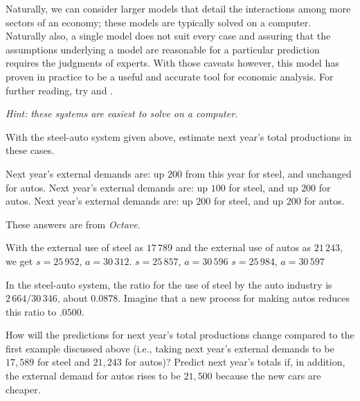 Naturally, we can consider larger models that detail the interactions 
among more sectors of an economy;
these models are typically solved on a computer.
Naturally also, a single model does not suit every case and 
assuring that the assumptions underlying a model
are reasonable for a particular prediction requires the judgments of experts.
With those caveats
however, this model has proven in practice to be a useful and accurate tool for
economic analysis.
For further reading, try \cite{Leontief1951} and \cite{Leontief1965}. 


\begin{exercises}
  \item[\textit{Hint:}]  
    \textit{these systems are easiest to solve on a computer.}
  \item 
    With the steel-auto system given above, estimate next year's
    total productions in these cases.
    \begin{exparts}
      \partsitem Next year's external demands are: up $200$ from this
         year for steel, and unchanged for autos.
      \partsitem Next year's external demands are: up $100$ for steel, and
         up $200$ for autos.
      \partsitem Next year's external demands are: up $200$ for steel, and
         up $200$ for autos.
    \end{exparts} 
    \begin{answer}
      These answers are from \textit{Octave}.
      \begin{exparts}
        \partsitem With the external use of steel as $17\,789$ and the 
          external use of autos as $21\,243$, we get $s=25\,952$, $a=30\,312$.
        \partsitem $s=25\,857$, $a=30\,596$
        \partsitem $s=25\,984$, $a=30\,597$
      \end{exparts}
    \end{answer}
  \item 
    In the steel-auto system, the ratio for the use of steel by the auto
    industry is $2\,664/30\,346$, about $0.0878$.
    Imagine that a new process for making autos reduces this 
    ratio to $.0500$.
    \begin{exparts}
      \partsitem How will the predictions for next year's total
        productions change compared to the first example discussed
        above (i.e., taking next year's external demands to be
        $17,589$ for steel and $21,243$ for autos)?
      \partsitem Predict next year's totals if, in addition,
        the external demand for
        autos rises to be $21,500$ because the new cars are cheaper.

\end{exparts}
\end{exercises}
